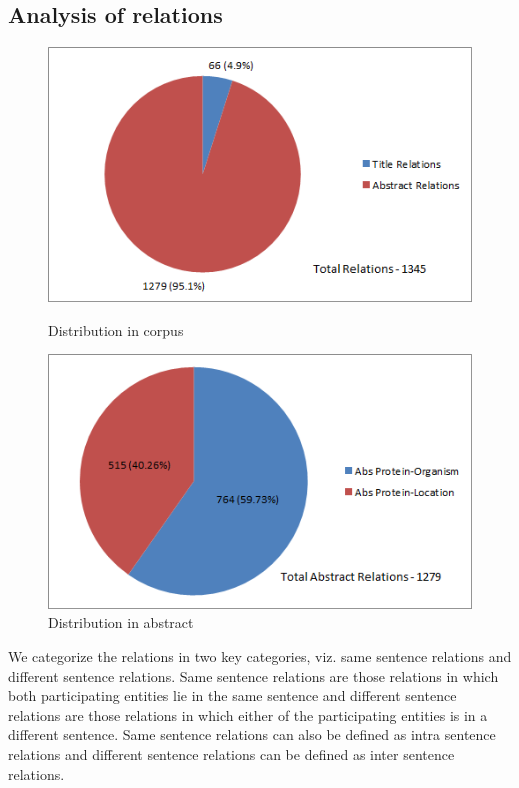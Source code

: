 \subsection*{Analysis of relations}

\begin{figure}
\centering
\begin{minipage}{.5\textwidth}
  \centering
  \includegraphics[width=.95\textwidth]{figures/Rel_Title_Abs_Distribution.png}
  \caption{Distribution in corpus}
  \label{fig:Rel_Title_Abs}
\end{minipage}%
\begin{minipage}{.5\textwidth}
  \centering
  \includegraphics[width=.95\textwidth]{figures/AbsRel_PO_PL_Distribution.png}
  \caption{Distribution in abstract}
  \label{fig:Rel_Abs_PO_PL}
\end{minipage}
\end{figure}

We categorize the relations in two key categories, viz. same sentence relations and  different sentence relations. Same sentence relations are those relations in which both participating entities lie in the same sentence and different sentence relations are those relations in which either of the participating entities is in a different sentence. Same sentence relations can also be defined as intra sentence relations and different sentence relations can be defined as inter sentence relations.


